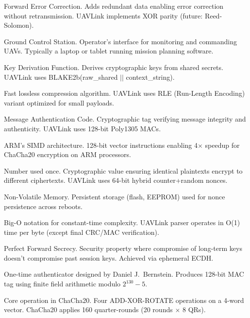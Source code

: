 \documentclass[11pt,a4paper]{article}
\begin{document}
\begin{description}[style=nextline]
    \item[FEC] Forward Error Correction. Adds redundant data enabling error correction without retransmission. UAVLink implements XOR parity (future: Reed-Solomon).
    
    \item[GCS] Ground Control Station. Operator's interface for monitoring and commanding UAVs. Typically a laptop or tablet running mission planning software.
    
    \item[KDF] Key Derivation Function. Derives cryptographic keys from shared secrets. UAVLink uses BLAKE2b(raw\_shared $||$ context\_string).
    
    \item[LZ4] Fast lossless compression algorithm. UAVLink uses RLE (Run-Length Encoding) variant optimized for small payloads.
    
    \item[MAC] Message Authentication Code. Cryptographic tag verifying message integrity and authenticity. UAVLink uses 128-bit Poly1305 MACs.
    
    \item[NEON] ARM's SIMD architecture. 128-bit vector instructions enabling 4$\times$ speedup for ChaCha20 encryption on ARM processors.
    
    \item[Nonce] Number used once. Cryptographic value ensuring identical plaintexts encrypt to different ciphertexts. UAVLink uses 64-bit hybrid counter+random nonces.
    
    \item[NVM] Non-Volatile Memory. Persistent storage (flash, EEPROM) used for nonce persistence across reboots.
    
    \item[O(1)] Big-O notation for constant-time complexity. UAVLink parser operates in O(1) time per byte (except final CRC/MAC verification).
    
    \item[PFS] Perfect Forward Secrecy. Security property where compromise of long-term keys doesn't compromise past session keys. Achieved via ephemeral ECDH.
    
    \item[Poly1305] One-time authenticator designed by Daniel J.\ Bernstein. Produces 128-bit MAC tag using finite field arithmetic modulo $2^{130} - 5$.
    
    \item[Quarter-Round] Core operation in ChaCha20. Four ADD-XOR-ROTATE operations on a 4-word vector. ChaCha20 applies 160 quarter-rounds (20 rounds $\times$ 8 QRs).
    

\end{description}
\end{document}
